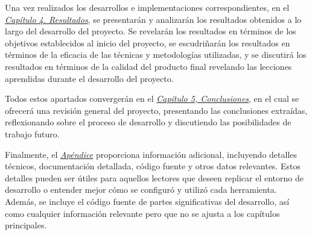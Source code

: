 Una vez realizados los desarrollos e implementaciones correspondientes, en el \hyperref[sec:cap4]{\textit{Capítulo 4. Resultados}}, se presentarán y analizarán los resultados obtenidos a lo largo del desarrollo del proyecto. Se revelarán los resultados en términos de los objetivos establecidos al inicio del proyecto, se escudriñarán los resultados en términos de la eficacia de las técnicas y metodologías utilizadas, y se discutirá los resultados en términos de la calidad del producto final revelando las lecciones aprendidas durante el desarrollo del proyecto.

Todos estos apartados convergerán en el \hyperref[sec:cap5]{\textit{Capítulo 5, Conclusiones}}, en el cual se ofrecerá una revisión general del proyecto, presentando las conclusiones extraídas, reflexionando sobre el proceso de desarrollo y discutiendo las posibilidades de trabajo futuro.

Finalmente, el \hyperref[sec:apendice]{\textit{Apéndice}} proporciona información adicional, incluyendo detalles técnicos, documentación detallada, código fuente y otros datos relevantes. Estos detalles pueden ser útiles para aquellos lectores que deseen replicar el entorno de desarrollo o entender mejor cómo se configuró y utilizó cada herramienta. Además, se incluye el código fuente de partes significativas del desarrollo, así como cualquier información  relevante pero que no se ajusta a los capítulos principales.






